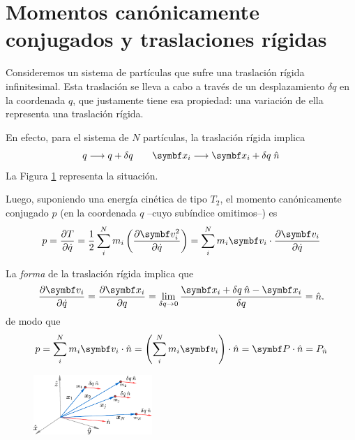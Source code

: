 \documentclass[10pt,oneside]{CBFT_book}
\begin{document}
\section{Momentos canónicamente conjugados y traslaciones rígidas}

Consideremos un sistema de partículas que sufre una traslación rígida infinitesimal.
Esta traslación se lleva a cabo a través de un desplazamiento $\delta q$ en la coordenada $ q $,
que justamente tiene esa propiedad: una variación de ella representa una traslación rígida.

En efecto, para el sistema de $ N $ partículas, la traslación rígida implica
\[
	q \longrightarrow q + \delta q \qquad 
	\vb{x}_i \longrightarrow \vb{x}_i + \delta q \; \hat{n}
\]
La Figura \ref{traslacion_rigida} representa la situación.

Luego, suponiendo una energía cinética de tipo $T_2$, el momento canónicamente conjugado $ p $ (en 
la coordenada $q$ --cuyo subíndice omitimos--) es
\[
	p = \dpar{T}{\dot{q}} = \frac{1}{2} \sum_i^N m_i \left( \dpar{\vb{v}_i^2}{\dot{q}}\right) =
	\sum_i^N m_i \vb{v}_i \cdot \dpar{\vb{v}_i}{\dot{q}} 
\]

La {\it forma} de la traslación rígida implica que 
\[
	\dpar{\vb{v}_i}{\dot{q}} = \dpar{\vb{x}_i}{q} = 
	\lim_{\delta q \to 0} \frac{\vb{x}_i + \delta q \:\hat{n} -\vb{x}_i}{\delta q} = \hat{n}.
\]
de modo que 
\[
	p = \sum_i^N m_i \vb{v}_i \cdot \hat{n} = \left( \sum_i^N m_i \vb{v}_i \right) \cdot \hat{n} 
	= \vb{P} \cdot \hat{n} = P_{\hat{n}}
\]

\begin{figure}[htb]
	\begin{center}
	\includegraphics[width=0.4\textwidth]{images/fig_mc_tras_rig.pdf}	 
	\end{center}
	\caption{}
	\label{traslacion_rigida}
\end{figure} 
\end{document}
